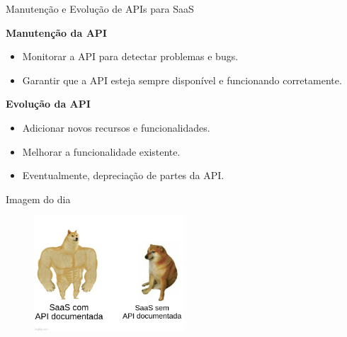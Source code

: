 \documentclass{beamer}
\begin{document}
\begin{frame}{Manutenção e Evolução de APIs para SaaS}

	\textbf{Manutenção da API}

	\begin{itemize}
		\item Monitorar a API para detectar problemas e bugs.
		\item Garantir que a API esteja sempre disponível e funcionando corretamente.
	\end{itemize}

	\textbf{Evolução da API}

	\begin{itemize}
		\item Adicionar novos recursos e funcionalidades.
		\item Melhorar a funcionalidade existente.
		\item Eventualmente, depreciação de partes da API.
	\end{itemize}

\end{frame}







\begin{frame}[fragile]{Imagem do dia}

	\begin{figure}[H]
		\centerline{\includegraphics[width=0.5\textwidth]{assets/imagem-do-dia/saas-api-meme.jpeg}}

	\end{figure}
\end{frame}

\footlinecolor{}

\backmatter
\end{document}
